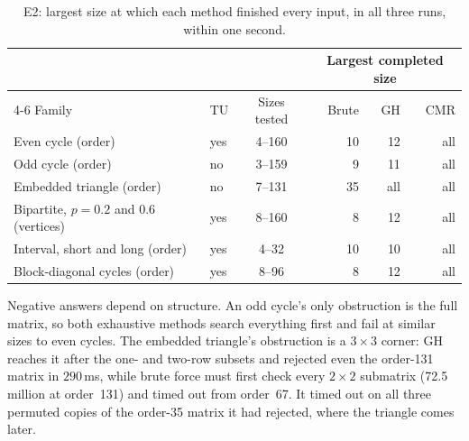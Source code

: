 \begin{table}[H]
  \centering\small
  \caption{E2: largest size at which each method finished every input, in all three runs, within one second.}
  \label{tab:e2}
  \begin{tabular}{@{}llcrrr@{}}
    \toprule
    & & & \multicolumn{3}{c}{Largest completed size} \\
    \cmidrule(l){4-6}
    Family & TU & Sizes tested & Brute & GH & CMR \\
    \midrule
    Even cycle (order) & yes & 4--160 & 10 & 12 & all \\
    Odd cycle (order) & no & 3--159 & 9 & 11 & all \\
    Embedded triangle (order) & no & 7--131 & 35 & all & all \\
    Bipartite, $p=0.2$ and $0.6$ (vertices) & yes & 8--160 & 8 & 12 & all \\
    Interval, short and long (order) & yes & 4--32 & 10 & 10 & all \\
    Block-diagonal cycles (order) & yes & 8--96 & 8 & 12 & all \\
    \bottomrule
  \end{tabular}
\end{table}

Negative answers depend on structure. An odd cycle's only obstruction is the full matrix, so both exhaustive methods search everything first and fail at similar sizes to even cycles. The embedded triangle's obstruction is a $3\times3$ corner: GH reaches it after the one- and two-row subsets and rejected even the order-131 matrix in $290$\,ms, while brute force must first check every $2\times2$ submatrix (72.5 million at order~131) and timed out from order~67. It timed out on all three permuted copies of the order-35 matrix it had rejected, where the triangle comes later.
